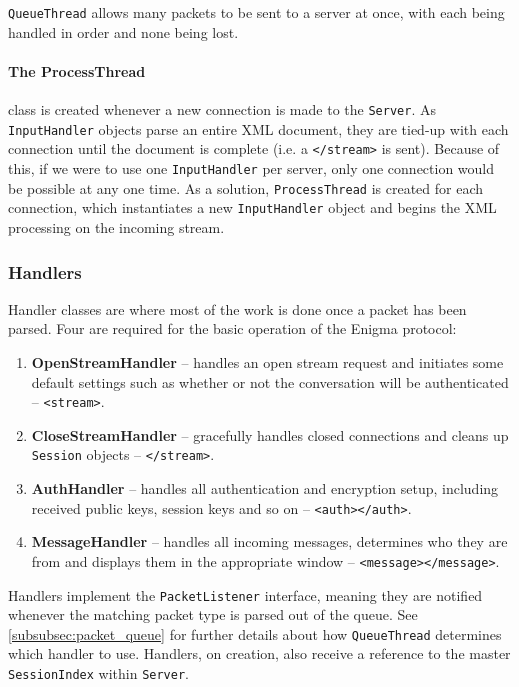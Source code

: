      \verb!QueueThread! allows many packets to be sent to a server at once, with each being handled in order and none being lost.
    
      \paragraph{The ProcessThread} class is created whenever a new connection is made to the \verb!Server!. As \verb!InputHandler! objects parse an entire XML document, they are tied-up with each connection until the document is complete (i.e. a \verb!</stream>! is sent). Because of this, if we were to use one \verb!InputHandler! per server, only one connection would be possible at any one time. As a solution, \verb!ProcessThread! is created for each connection, which instantiates a new \verb!InputHandler! object and begins the XML processing on the incoming stream.
    
    \subsubsection{Handlers}
    \label{subsubsec:handlers}
    
    Handler classes are where most of the work is done once a packet has been parsed. Four are required for the basic operation of the Enigma protocol:
    
    \begin{enumerate}
      \item \textbf{OpenStreamHandler} -- handles an open stream request and initiates some default settings such as whether or not the conversation will be authenticated -- \verb!<stream>!.
      \item \textbf{CloseStreamHandler} -- gracefully handles closed connections and cleans up \verb!Session! objects -- \verb!</stream>!.
      \item \textbf{AuthHandler} -- handles all authentication and encryption setup, including received public keys, session keys and so on -- \verb!<auth></auth>!.
      \item \textbf{MessageHandler} -- handles all incoming messages, determines who they are from and displays them in the appropriate window -- \verb!<message></message>!.
    \end{enumerate}
    
    Handlers implement the \verb!PacketListener! interface, meaning they are notified whenever the matching packet type is parsed out of the queue. See \textsection\ref{subsubsec:packet_queue} for further details about how \verb!QueueThread! determines which handler to use. Handlers, on creation, also receive a reference to the master \verb!SessionIndex! within \verb!Server!.
    
